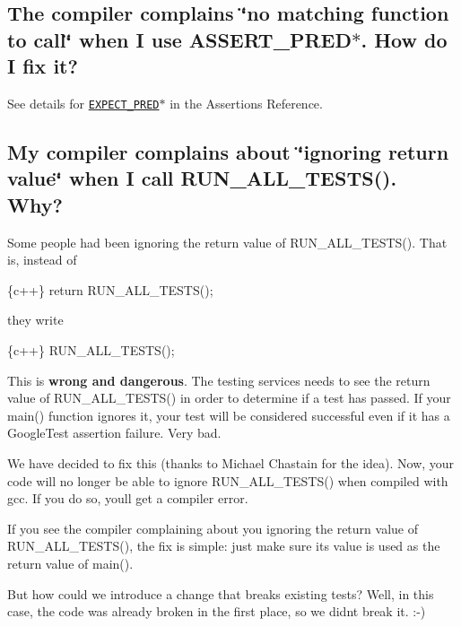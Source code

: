\subsection*{The compiler complains \char`\"{}no matching function to call\char`\"{} when I use {\ttfamily A\+S\+S\+E\+R\+T\+\_\+\+P\+R\+E\+D$\ast$}. How do I fix it?}

See details for \href{reference/assertions.md#EXPECT_PRED}{\tt {\ttfamily E\+X\+P\+E\+C\+T\+\_\+\+P\+R\+E\+D$\ast$}} in the Assertions Reference.

\subsection*{My compiler complains about \char`\"{}ignoring return value\char`\"{} when I call R\+U\+N\+\_\+\+A\+L\+L\+\_\+\+T\+E\+S\+T\+S(). Why?}

Some people had been ignoring the return value of {\ttfamily R\+U\+N\+\_\+\+A\+L\+L\+\_\+\+T\+E\+S\+T\+S()}. That is, instead of


\begin{DoxyCode}
\{c++\}
  return RUN\_ALL\_TESTS();
\end{DoxyCode}


they write


\begin{DoxyCode}
\{c++\}
  RUN\_ALL\_TESTS();
\end{DoxyCode}


This is {\bfseries wrong and dangerous}. The testing services needs to see the return value of {\ttfamily R\+U\+N\+\_\+\+A\+L\+L\+\_\+\+T\+E\+S\+T\+S()} in order to determine if a test has passed. If your {\ttfamily main()} function ignores it, your test will be considered successful even if it has a Google\+Test assertion failure. Very bad.

We have decided to fix this (thanks to Michael Chastain for the idea). Now, your code will no longer be able to ignore {\ttfamily R\+U\+N\+\_\+\+A\+L\+L\+\_\+\+T\+E\+S\+T\+S()} when compiled with {\ttfamily gcc}. If you do so, you\textquotesingle{}ll get a compiler error.

If you see the compiler complaining about you ignoring the return value of {\ttfamily R\+U\+N\+\_\+\+A\+L\+L\+\_\+\+T\+E\+S\+T\+S()}, the fix is simple\+: just make sure its value is used as the return value of {\ttfamily main()}.

But how could we introduce a change that breaks existing tests? Well, in this case, the code was already broken in the first place, so we didn\textquotesingle{}t break it. \+:-\/)

